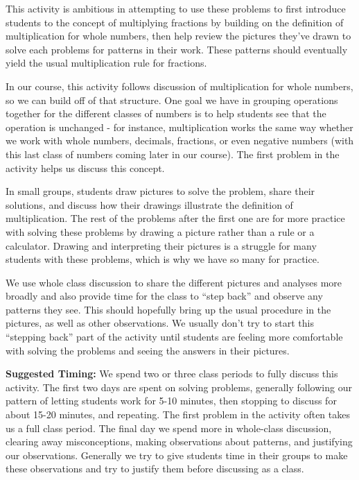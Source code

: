 \documentclass[nooutcomes]{ximera}
\begin{document}
\newpage
\begin{instructorNotes}
This activity is ambitious in attempting to use these problems to first introduce students to the concept of multiplying fractions by building on the definition of multiplication for whole numbers, then help review the pictures they've drawn to solve each problems for patterns in their work.  These patterns should eventually yield the usual multiplication rule for fractions.  

In our course, this activity follows discussion of multiplication for whole numbers, so we can build off of that structure.  One goal we have in grouping operations together for the different classes of numbers is to help students see that the operation is unchanged - for instance, multiplication works the same way whether we work with whole numbers, decimals, fractions, or even negative numbers (with this last class of numbers coming later in our course).  The first problem in the activity helps us discuss this concept.

In small groups, students draw pictures to solve the problem, share their solutions, and discuss how their drawings illustrate the definition of multiplication.  The rest of the problems after the first one are for more practice with solving these problems by drawing a picture rather than a rule or a calculator.  Drawing and interpreting their pictures is a struggle for many students with these problems, which is why we have so many for practice.

We use whole class discussion to share the different pictures and analyses more broadly and also provide time for the class to ``step back''  and observe any patterns they see.  This should hopefully bring up the usual procedure in the pictures, as well as other observations.  We usually don't try to start this ``stepping back'' part of the activity until students are feeling more comfortable with solving the problems and seeing the answers in their pictures.

{\bf Suggested Timing:} We spend two or three class periods to fully discuss this activity.  The first two days are spent on solving problems, generally following our pattern of letting students work for 5-10 minutes, then stopping to discuss for about 15-20 minutes, and repeating.  The first problem in the activity often takes us a full class period.  The final day we spend more in whole-class discussion, clearing away misconceptions, making observations about patterns, and justifying our observations.  Generally we try to give students time in their groups to make these observations and try to justify them before discussing as a class.
\end{instructorNotes}
\end{document}
